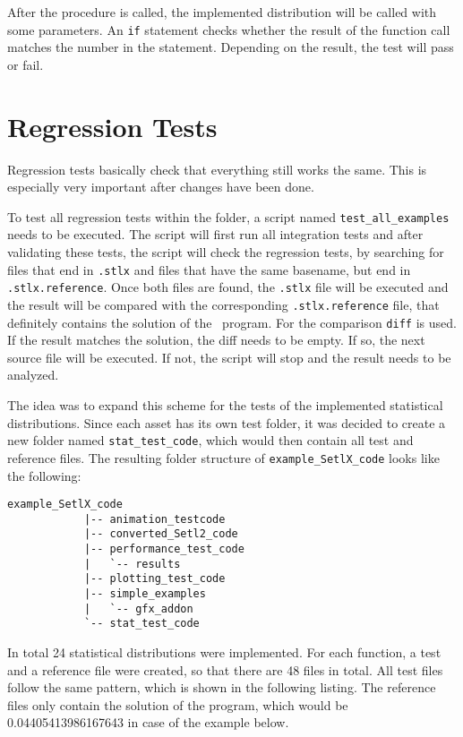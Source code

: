 	After the procedure is called, the implemented distribution will be called with some parameters. An \lstinline{if} statement checks whether the result of the function call matches the number in the statement. Depending on the result, the test will pass or fail.


\section{Regression Tests}

	Regression tests basically check that everything still works the same. This is especially very important after changes have been done.

	To test all regression tests within the folder, a script named \lstinline{test_all_examples} needs to be executed. The script will first run all integration tests and after validating these tests, the script will check the regression tests, by searching for files that end in \lstinline{.stlx} and files that have the same basename, but end in \lstinline{.stlx.reference}. Once both files are found, the \lstinline{.stlx} file will be executed and the result will be compared with the corresponding \lstinline{.stlx.reference} file, that definitely contains the solution of the \setlx\ program. For the comparison \lstinline{diff} is used. If the result matches the solution, the diff needs to be empty. If so, the next source file will be executed. If not, the script will stop and the result needs to be analyzed.

	The idea was to expand this scheme for the tests of the implemented statistical distributions. Since each asset has its own test folder, it was decided to create a new folder named \lstinline{stat_test_code}, which would then contain all test and reference files. The resulting folder structure of \lstinline{example_SetlX_code} looks like the following:
	
	\begin{center}
		\begin{lstlisting}[caption={Folder Structure \lstinline{example\_SetlX\_code}}, label={lis:regressionTests}]
			example_SetlX_code
			|-- animation_testcode
			|-- converted_Setl2_code
			|-- performance_test_code
			|   `-- results
			|-- plotting_test_code
			|-- simple_examples
			|   `-- gfx_addon
			`-- stat_test_code
		\end{lstlisting}
	\end{center}

	In total 24 statistical distributions were implemented. For each function, a test and a reference file were created, so that there are 48 files in total. All test files follow the same pattern, which is shown in the following listing. The reference files only contain the solution of the program, which would be 0.04405413986167643 in case of the example below.

